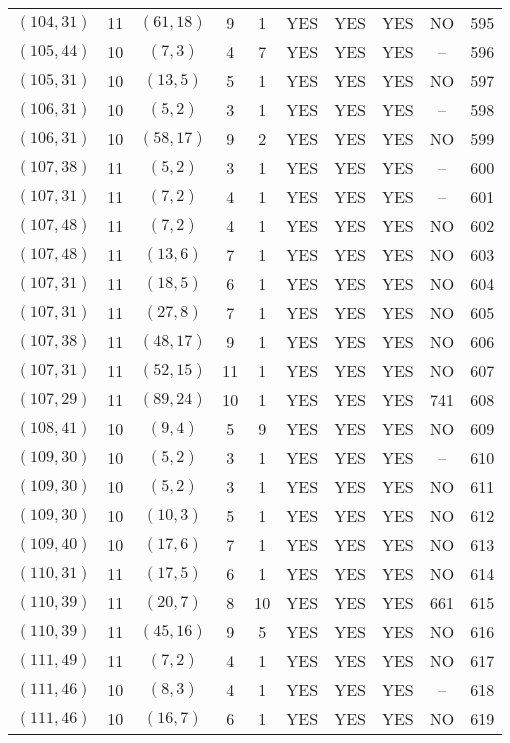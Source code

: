 \begin{longtable}{|c|c|c|c|c|c|c|c|c|c|}
$(104, 31)$ & 11 & $(61, 18)$ & 9 & 1 & YES & YES & YES & NO & 595\\
$(105, 44)$ & 10 & $(7, 3)$ & 4 & 7 & YES & YES & YES & -- & 596\\
$(105, 31)$ & 10 & $(13, 5)$ & 5 & 1 & YES & YES & YES & NO & 597\\
$(106, 31)$ & 10 & $(5, 2)$ & 3 & 1 & YES & YES & YES & -- & 598\\
$(106, 31)$ & 10 & $(58, 17)$ & 9 & 2 & YES & YES & YES & NO & 599\\
$(107, 38)$ & 11 & $(5, 2)$ & 3 & 1 & YES & YES & YES & -- & 600\\
$(107, 31)$ & 11 & $(7, 2)$ & 4 & 1 & YES & YES & YES & -- & 601\\
$(107, 48)$ & 11 & $(7, 2)$ & 4 & 1 & YES & YES & YES & NO & 602\\
$(107, 48)$ & 11 & $(13, 6)$ & 7 & 1 & YES & YES & YES & NO & 603\\
$(107, 31)$ & 11 & $(18, 5)$ & 6 & 1 & YES & YES & YES & NO & 604\\
$(107, 31)$ & 11 & $(27, 8)$ & 7 & 1 & YES & YES & YES & NO & 605\\
$(107, 38)$ & 11 & $(48, 17)$ & 9 & 1 & YES & YES & YES & NO & 606\\
$(107, 31)$ & 11 & $(52, 15)$ & 11 & 1 & YES & YES & YES & NO & 607\\
$(107, 29)$ & 11 & $(89, 24)$ & 10 & 1 & YES & YES & YES & 741 & 608\\
$(108, 41)$ & 10 & $(9, 4)$ & 5 & 9 & YES & YES & YES & NO & 609\\
$(109, 30)$ & 10 & $(5, 2)$ & 3 & 1 & YES & YES & YES & -- & 610\\
$(109, 30)$ & 10 & $(5, 2)$ & 3 & 1 & YES & YES & YES & NO & 611\\
$(109, 30)$ & 10 & $(10, 3)$ & 5 & 1 & YES & YES & YES & NO & 612\\
$(109, 40)$ & 10 & $(17, 6)$ & 7 & 1 & YES & YES & YES & NO & 613\\
$(110, 31)$ & 11 & $(17, 5)$ & 6 & 1 & YES & YES & YES & NO & 614\\
$(110, 39)$ & 11 & $(20, 7)$ & 8 & 10 & YES & YES & YES & 661 & 615\\
$(110, 39)$ & 11 & $(45, 16)$ & 9 & 5 & YES & YES & YES & NO & 616\\
$(111, 49)$ & 11 & $(7, 2)$ & 4 & 1 & YES & YES & YES & NO & 617\\
$(111, 46)$ & 10 & $(8, 3)$ & 4 & 1 & YES & YES & YES & -- & 618\\
$(111, 46)$ & 10 & $(16, 7)$ & 6 & 1 & YES & YES & YES & NO & 619\\

\end{longtable}
